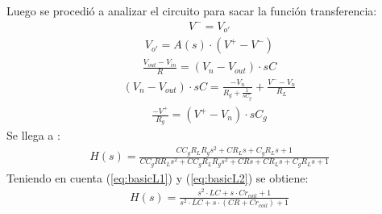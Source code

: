 Luego se procedió a analizar el circuito para sacar la función transferencia:
\begin{align}V^- = V_{o'}\end{align}
\begin{align}V_{o'} = A(s)\cdot (V^+-V^-)\end{align}
\begin{align}\frac{V_{out}-V_{in}}{R}=(V_n-V_{out})\cdot sC\end{align}
\begin{align}(V_n-V_{out})\cdot sC = \frac{-V_n}{R_g+\frac{1}{sC_g}}+\frac{V^--V_n}{R_L}\end{align}
\begin{align}\frac{-V^+}{R_g}=(V^+-V_n)\cdot sC_g\end{align}
Se llega a :
\begin{align}  H(s)=\frac{C C_{g} R_{L} R_{g} s^{2} + C R_{L} s + C_{g} R_{L} s + 1}{C C_{g} R R_{L} s^{2} + C C_{g} R_{L} R_{g} s^{2} + C R s + C R_{L} s + C_{g} R_{L} s + 1} \end{align}
Teniendo en cuenta (\ref{eq:basicL1}) y (\ref{eq:basicL2}) se obtiene:
\begin{align}  H(s)=\frac{ s^{2}\cdot  LC + s \cdot  C r_{coil} + 1}{ s^{2}\cdot LC + s\cdot (C R+Cr_{coil}) + 1} 
\label{eq:BRG}
\end{align}

